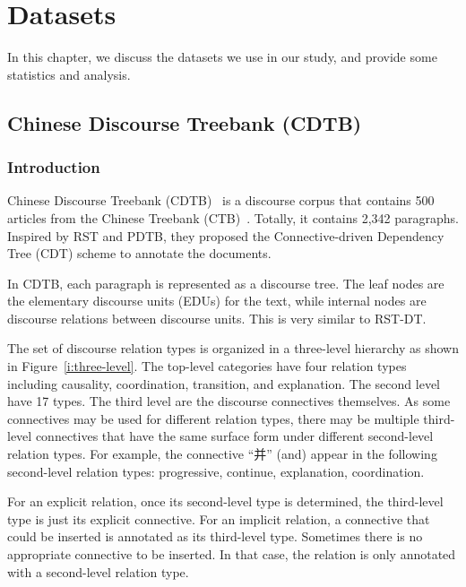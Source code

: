 %
%
%
\chapter{Datasets}
\label{c:datasets}

In this chapter, we discuss the datasets we use in our study, and
provide some statistics and analysis.

\section{Chinese Discourse Treebank (CDTB)}
\label{c:CDTB}
\subsection{Introduction}

Chinese Discourse Treebank (CDTB)~\citep{li2014building} is a discourse
corpus that contains 500 articles from the Chinese Treebank (CTB)~\citep{xue2005penn}.
Totally, it contains 2,342 paragraphs.
Inspired by RST and PDTB, they proposed the Connective-driven Dependency Tree (CDT)
scheme to annotate the documents.

In CDTB, each paragraph is represented as a discourse tree. The leaf nodes are the
elementary discourse units (EDUs) for the text, while internal nodes are discourse
relations between discourse units. This is very similar to RST-DT.

The set of discourse relation types is organized in a three-level hierarchy as
shown in Figure~\ref{i:three-level}.
The top-level categories have four relation types including causality, coordination,
transition, and explanation. The second level
have 17 types. The third level are the discourse connectives themselves.
As some connectives may be used for different relation types, there may
be multiple third-level connectives that have the same surface form under
different second-level relation types. For example, the connective
``并'' (and) appear in the following second-level relation types:
progressive, continue, explanation, coordination.



For an explicit relation, once its second-level type is determined, the
third-level type is just its explicit connective. For an implicit relation,
a connective that could be inserted is annotated as its third-level type.
Sometimes there is no appropriate connective to be inserted. In that case,
the relation is only annotated with a second-level relation type.

